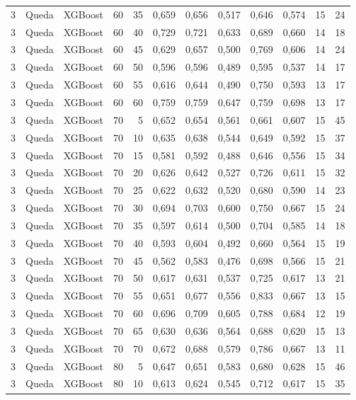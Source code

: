 \begin{longtable}{@{}rllrrrrrrrrr@{}}
3 & Queda & XGBoost & 60 & 35 & 0,659 & 0,656 & 0,517 & 0,646 & 0,574 & 15 & 24 \\
3 & Queda & XGBoost & 60 & 40 & 0,729 & 0,721 & 0,633 & 0,689 & 0,660 & 14 & 18 \\
3 & Queda & XGBoost & 60 & 45 & 0,629 & 0,657 & 0,500 & 0,769 & 0,606 & 14 & 24 \\
3 & Queda & XGBoost & 60 & 50 & 0,596 & 0,596 & 0,489 & 0,595 & 0,537 & 14 & 17 \\
3 & Queda & XGBoost & 60 & 55 & 0,616 & 0,644 & 0,490 & 0,750 & 0,593 & 13 & 17 \\
3 & Queda & XGBoost & 60 & 60 & 0,759 & 0,759 & 0,647 & 0,759 & 0,698 & 13 & 17 \\
3 & Queda & XGBoost & 70 & 5 & 0,652 & 0,654 & 0,561 & 0,661 & 0,607 & 15 & 45 \\
3 & Queda & XGBoost & 70 & 10 & 0,635 & 0,638 & 0,544 & 0,649 & 0,592 & 15 & 37 \\
3 & Queda & XGBoost & 70 & 15 & 0,581 & 0,592 & 0,488 & 0,646 & 0,556 & 15 & 34 \\
3 & Queda & XGBoost & 70 & 20 & 0,626 & 0,642 & 0,527 & 0,726 & 0,611 & 15 & 32 \\
3 & Queda & XGBoost & 70 & 25 & 0,622 & 0,632 & 0,520 & 0,680 & 0,590 & 14 & 23 \\
3 & Queda & XGBoost & 70 & 30 & 0,694 & 0,703 & 0,600 & 0,750 & 0,667 & 15 & 24 \\
3 & Queda & XGBoost & 70 & 35 & 0,597 & 0,614 & 0,500 & 0,704 & 0,585 & 14 & 18 \\
3 & Queda & XGBoost & 70 & 40 & 0,593 & 0,604 & 0,492 & 0,660 & 0,564 & 15 & 19 \\
3 & Queda & XGBoost & 70 & 45 & 0,562 & 0,583 & 0,476 & 0,698 & 0,566 & 15 & 21 \\
3 & Queda & XGBoost & 70 & 50 & 0,617 & 0,631 & 0,537 & 0,725 & 0,617 & 13 & 21 \\
3 & Queda & XGBoost & 70 & 55 & 0,651 & 0,677 & 0,556 & 0,833 & 0,667 & 13 & 15 \\
3 & Queda & XGBoost & 70 & 60 & 0,696 & 0,709 & 0,605 & 0,788 & 0,684 & 12 & 19 \\
3 & Queda & XGBoost & 70 & 65 & 0,630 & 0,636 & 0,564 & 0,688 & 0,620 & 15 & 13 \\
3 & Queda & XGBoost & 70 & 70 & 0,672 & 0,688 & 0,579 & 0,786 & 0,667 & 13 & 11 \\
3 & Queda & XGBoost & 80 & 5 & 0,647 & 0,651 & 0,583 & 0,680 & 0,628 & 15 & 46 \\
3 & Queda & XGBoost & 80 & 10 & 0,613 & 0,624 & 0,545 & 0,712 & 0,617 & 15 & 35 \\

\end{longtable}
